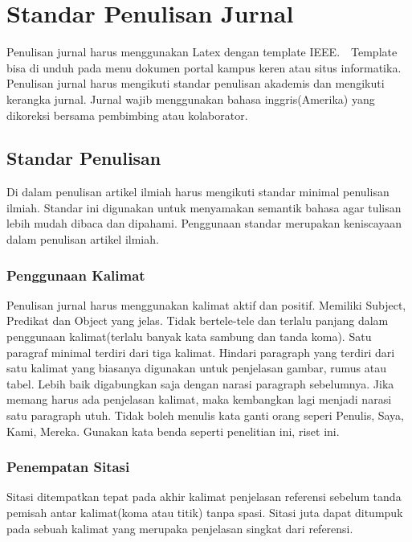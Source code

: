 \chapter{Standar Penulisan Jurnal}

Penulisan jurnal harus menggunakan Latex dengan template IEEE.　Template bisa di unduh pada menu dokumen portal kampus keren atau situs informatika. Penulisan jurnal harus mengikuti standar penulisan akademis dan mengikuti kerangka jurnal. Jurnal wajib menggunakan bahasa inggris(Amerika) yang dikoreksi bersama pembimbing atau kolaborator. 

\section{Standar Penulisan}
Di dalam penulisan artikel ilmiah harus mengikuti standar minimal penulisan ilmiah. Standar ini digunakan untuk menyamakan semantik bahasa agar tulisan lebih mudah dibaca dan dipahami. Penggunaan standar merupakan keniscayaan dalam penulisan artikel ilmiah.
\subsection{Penggunaan Kalimat}
Penulisan jurnal harus menggunakan kalimat aktif dan positif. Memiliki Subject, Predikat dan Object yang jelas. Tidak bertele-tele dan terlalu panjang dalam penggunaan kalimat(terlalu banyak kata sambung dan tanda koma). Satu paragraf minimal terdiri dari tiga kalimat. Hindari paragraph yang terdiri dari satu kalimat yang biasanya digunakan untuk penjelasan gambar, rumus atau tabel. Lebih baik digabungkan saja dengan narasi paragraph sebelumnya. Jika memang harus ada penjelasan kalimat, maka kembangkan lagi menjadi narasi satu paragraph utuh. Tidak boleh menulis kata ganti orang seperi Penulis, Saya, Kami, Mereka. Gunakan kata benda seperti penelitian ini, riset ini.
\subsection{Penempatan Sitasi}
Sitasi ditempatkan tepat pada akhir kalimat penjelasan referensi sebelum tanda pemisah antar kalimat(koma atau titik) tanpa spasi. Sitasi juta dapat ditumpuk pada sebuah kalimat yang merupaka  penjelasan singkat dari referensi. 
